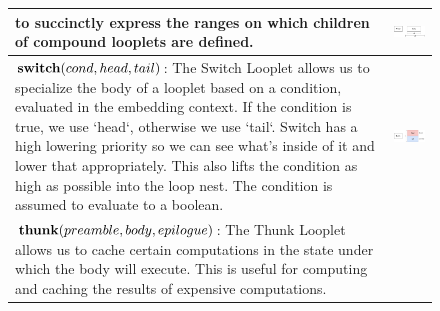 \begin{figure}[ht]
\begin{tabular} {|l|c|}
\begin{minipage}[c]{0.65\linewidth}
        to succinctly express the ranges on which children of compound looplets
        are defined.
    \end{minipage} &
    \begin{minipage}[c]{0.35\linewidth}
        \centering
        \includegraphics[scale=0.20]{Looplets-phase.png}
    \end{minipage} \\ \hline
    \begin{minipage}[c]{0.65\linewidth}
        $\text{\textbf{switch}}(cond, head, tail)$: The Switch Looplet allows
        us to specialize the body of a looplet based on a condition, evaluated
        in the embedding context. If the condition is true, we use `head`,
        otherwise we use `tail`. Switch has a high lowering priority so we can
        see what's inside of it and lower that appropriately. This also lifts
        the condition as high as possible into the loop nest. The condition is
        assumed to evaluate to a boolean.
    \end{minipage} &
    \begin{minipage}[c]{0.35\linewidth}
        \centering
        \includegraphics[scale=0.20]{Looplets-switch.png}
    \end{minipage} \\ \hline
    \begin{minipage}[c]{0.65\linewidth}
        $\text{\textbf{thunk}}(preamble, body, epilogue)$: The Thunk Looplet
        allows us to cache certain computations in the state under which the
        body will execute. This is useful for computing and caching the results
        of expensive computations.
    \end{minipage} &

\end{tabular}
\end{figure}
